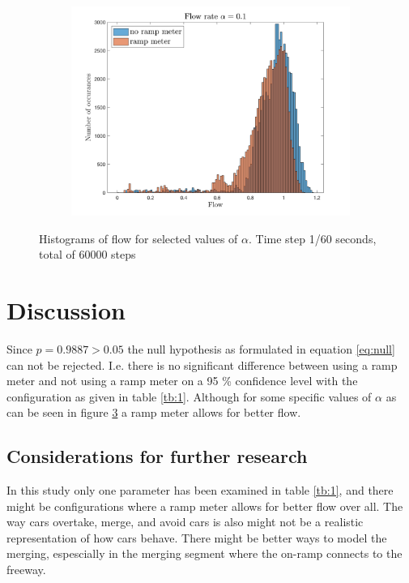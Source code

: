 \documentclass{article}
\begin{document}
\begin{figure}
\begin{subfigure}{0.33\textwidth}
        \caption{ }
        \label{sub:4}
      \end{subfigure}%
      \begin{subfigure}{0.33\textwidth}
        \centering
        \includegraphics[width=\linewidth]{fig5.png}
        \caption{ }
        \label{sub:5}
      \end{subfigure}
      \caption{Histograms of flow for selected values of $\alpha$. Time step 1/60 seconds, total of 60000 steps}
      \label{fig:hist}
    \end{figure}
\section{Discussion}
  Since $p=0.9887 > 0.05$ the null hypothesis as formulated in equation \ref{eq:null} can not be
  rejected. I.e. there is no significant difference between using a ramp meter and not using
  a ramp meter on a 95 \% confidence level with the configuration as given in table \ref{tb:1}.
  Although for some specific values of $\alpha$ as can be seen in figure \ref{fig:hist} a
  ramp meter allows for better flow.
  \subsection{Considerations for further research}
    In this study only one parameter has been examined in table \ref{tb:1}, and
    there might be configurations where a ramp meter allows for better flow over all.
    The way cars overtake, merge, and avoid cars is also might not
    be a realistic representation of how cars behave. There might be better
    ways to model the merging, espescially in the merging segment where
    the on-ramp connects to the freeway.
\end{document}
